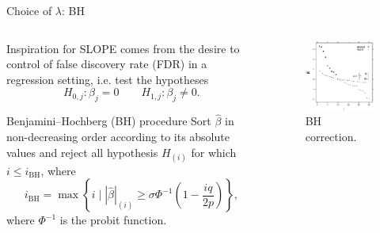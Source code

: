\documentclass[10pt]{beamer}
\begin{document}
\begin{frame}{Choice of \(\lambda\): BH}

\begin{columns}[T]
\begin{column}{0.45\linewidth}
    Inspiration for SLOPE comes from the desire to
    control of false discovery rate (FDR) in a regression setting, i.e.
    test the hypotheses
    \[
        H_{0,j}: \beta_j = 0 \qquad H_{1,j}: \beta_j \neq 0.
    \]
    
    \begin{block}{Benjamini--Hochberg (BH) procedure}
        Sort \(\hat\beta\) in non-decreasing order according to its absolute values and reject all hypothesis \(H_{(i)}\) for which \(i \leq i_{\text{BH}}\), where
        \[
            i_\text{BH} = \max\left\{i \mid |\hat\beta|_{(i)} \geq \sigma\Phi^{-1}\left(1 - \frac{iq}{2p}\right)\right\},
        \]
        where \(\Phi^{-1}\) is the probit function.
    \end{block}
\end{column}
\begin{column}{0.45\linewidth}
    \begin{figure}
        \centering
        \includegraphics[width=\linewidth]{figures/bh.pdf}
        \caption{BH correction.}
    \end{figure}
\end{column}
\end{columns}
\end{frame}
\end{document}
